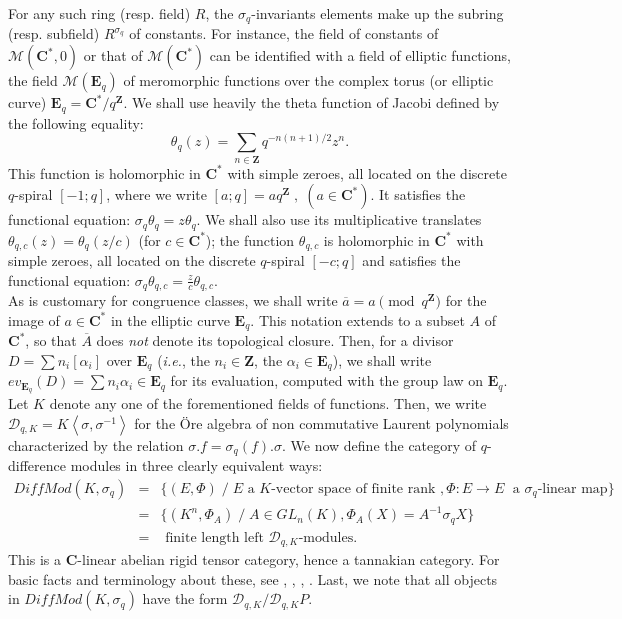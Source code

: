 \documentclass[english]{smfart}
\numberwithin{equation}{thm}
\def\sq{\sigma_q}
\def\C{{\mathbf C}}
\def\Z{{\mathbf Z}}
\def\M{{\mathcal{M}}}
\def\D{{\mathcal{D}_{q,K}}}
\def\Eq{{\mathbf{E}_{q}}}
\def\DM{{DiffMod(K,\sq)}}
\def\l{\left}
\def\r{\right}
\def\th{\theta}
\begin{document}
For any such ring (resp. field) $R$, the $\sq$-invariants elements
make up the subring (resp. subfield) $R^{\sq}$ of constants. For
instance, the field of constants of $\M(\C^{*},0)$ or that of
$\M(\C^{*})$ can be identified with a field of elliptic functions,
the field $\M(\Eq)$ of meromorphic functions over the complex torus
(or elliptic curve) $\Eq = \C^{*}/q^{\Z}$.
We shall use heavily the theta function of Jacobi defined by the
following equality:
$$
\th_{q}(z) = \sum_{n \in \Z} q^{-n(n+1)/2} z^{n}.
$$
This function is holomorphic in $\C^{*}$ with simple zeroes, all
located on the discrete $q$-spiral $[-1;q]$, where we write
$[a;q] = a q^{\Z} \;,\; (a \in \C^{*})$. It satisfies the
functional equation: $\sq \th_{q} = z \th_{q}$. We shall also
use its multiplicative translates $\th_{q,c}(z) = \th_{q}(z/c)$
(for $c \in \C^{*}$); the function $\th_{q,c}$ is holomorphic 
in $\C^{*}$ with simple zeroes, all located on the discrete 
$q$-spiral $[-c;q]$ and satisfies the functional equation: 
$\sq \th_{q,c} = \frac{z}{c} \th_{q,c}$. \\

As is customary for congruence classes,
we shall write $\overline{a} = a \pmod{q^{\Z}}$ for the image
of $a \in \C^{*}$ in the elliptic curve $\Eq$. This notation
extends to a subset $A$ of $\C^{*}$, so that $\overline{A}$
does \emph{not} denote its topological closure. Then, for a divisor
$D = \sum n_{i} [\alpha_{i}]$ over $\Eq$ (\emph{i.e.}, the $n_{i} \in \Z$,
the $\alpha_{i} \in \Eq$), we shall write 
$ev_{\Eq}(D) = \sum n_{i} \alpha_{i} \in \Eq$ for its evaluation, 
computed with the group law on $\Eq$. \\

Let $K$ denote any one of the forementioned fields of functions.
Then, we write $\D = K\l<\sigma,\sigma^{-1}\r>$ for the \"{O}re algebra
of non commutative Laurent polynomials characterized by the relation
$\sigma . f = \sq(f) . \sigma$. We now define the category of 
$q$-difference modules in three clearly equivalent ways:
\begin{eqnarray*}
\DM & = & \{(E,\Phi) \;/\; E \text{~a~} K \text{-vector space of finite rank~},
                        \Phi : E \rightarrow E \; 
                               \text{~a~} \sq \text{-linear} \text{~map}\} \\
    & = & \{(K^{n}, \Phi_{A}) \;/\; A \in GL_{n}(K) ,
                                    \Phi_{A}(X) = A^{-1} \sq X \} \\
    & = & \text{~finite length left~} \D \text{-modules}.
    \end{eqnarray*}
This is a $\C$-linear abelian rigid tensor category, hence
a tannakian category. For basic facts and terminology about these,
see \cite{JSGAL}, \cite{vdPS}, \cite{DM}, \cite{DF}. 
Last, we note that all objects in $\DM$ have the form $\D / \D P$. 
\end{document}
